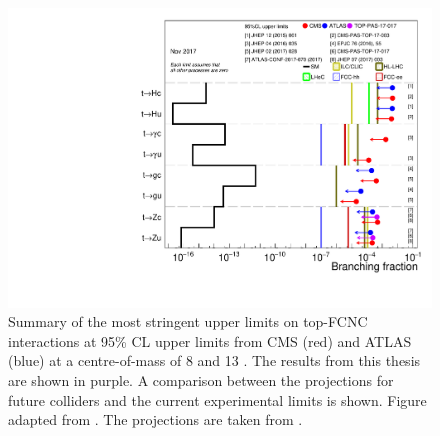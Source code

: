 \begin{figure}[htbp]
	\centering
	\includegraphics[width=0.7\linewidth]{7_Conclusion/Figures/fcnc_upperlimits_proj.pdf}
	\caption{Summary of the most stringent upper limits on top-FCNC interactions at 95\% CL upper limits from CMS (red) and ATLAS (blue) at a centre-of-mass of 8 and 13 \TeV. The results from this thesis are shown in purple. A comparison between the projections for future colliders and the current experimental limits is shown. Figure adapted from \cite{summarywiki}. The projections are taken from \cite{Liu:2015kkp,Agashe:2013hma,Khanpour:2014xla,Mangano:2016jyj}.}
	\label{fig:fcncupperlimitproj}
\end{figure}